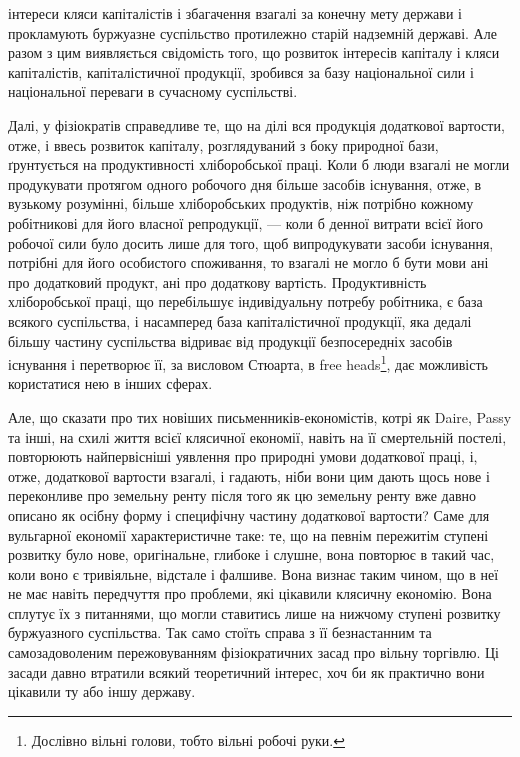 \parcont{}  %
інтереси кляси капіталістів і збагачення взагалі за конечну мету держави і прокламують
буржуазне суспільство протилежно старій надземній державі. Але разом
з цим виявляється свідомість того, що розвиток інтересів капіталу і кляси капіталістів,
капіталістичної продукції, зробився за базу національної сили і національної
переваги в сучасному суспільстві.

Далі, у фізіократів справедливе те, що на ділі вся продукція додаткової вартости,
отже, і ввесь розвиток капіталу, розглядуваний з боку природної бази,
ґрунтується на продуктивності хліборобської праці. Коли б люди взагалі не могли
продукувати протягом одного робочого дня більше засобів існування, отже, в вузькому
розумінні, більше хліборобських продуктів, ніж потрібно кожному робітникові
для його власної репродукції, — коли б денної витрати всієї його робочої сили
було досить лише для того, щоб випродукувати засоби існування, потрібні для
його особистого споживання, то взагалі не могло б бути мови ані про додатковий
продукт, ані про додаткову вартість. Продуктивність хліборобської праці, що
перебільшує індивідуальну потребу робітника, є база всякого суспільства, і насамперед
база капіталістичної продукції, яка дедалі більшу частину суспільства
відриває від продукції безпосередніх засобів існування і перетворює її, за висловом
Стюарта, в free heads\footnote*{
Дослівно вільні голови, тобто вільні робочі руки. 
}, дає можливість користатися нею в інших сферах.

Але, що сказати про тих новіших письменників-економістів, котрі як
Daire, Passy та інші, на схилі життя всієї клясичної економії, навіть на її смертельній
постелі, повторюють найпервісніші уявлення про природні умови додаткової
праці, і, отже, додаткової вартости взагалі, і гадають, ніби вони цим дають
щось нове і переконливе про земельну ренту після того як цю земельну ренту
вже давно описано як осібну форму і специфічну частину додаткової вартости?
Саме для вульгарної економії характеристичне таке: те, що на певнім пережитім ступені
розвитку було нове, оригінальне, глибоке і слушне, вона повторює в
такий час, коли воно є тривіяльне, відстале і фалшиве. Вона визнає таким
чином, що в неї не має навіть передчуття про проблеми, які цікавили клясичну
економію. Вона сплутує їх з питаннями, що могли ставитись лише на нижчому
ступені розвитку буржуазного суспільства. Так само стоїть справа з її безнастанним
та самозадоволеним пережовуванням фізіократичних засад про вільну
торгівлю. Ці засади давно втратили всякий теоретичний інтерес, хоч би як
практично вони цікавили ту або іншу державу.

